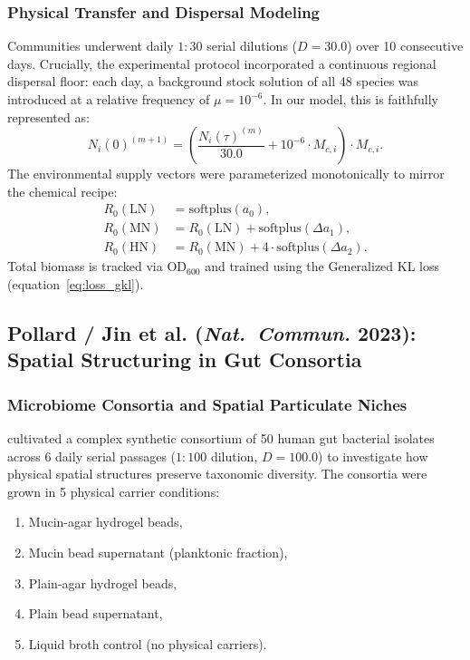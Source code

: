 \subsubsection{Physical Transfer and Dispersal Modeling}
Communities underwent daily $1:30$ serial dilutions ($D = 30.0$) over 10 consecutive days. Crucially, the experimental protocol incorporated a continuous regional dispersal floor: each day, a background stock solution of all 48 species was introduced at a relative frequency of $\mu = 10^{-6}$. In our model, this is faithfully represented as:
\begin{equation}
    N_i(0)^{(m+1)} = \left( \frac{N_i(\tau)^{(m)}}{30.0} + 10^{-6} \cdot M_{c, i} \right) \cdot M_{c, i}.
\end{equation}
The environmental supply vectors were parameterized monotonically to mirror the chemical recipe:
\begin{align}
    R_0(\text{LN}) &= \text{softplus}(a_0), \nonumber \\
    R_0(\text{MN}) &= R_0(\text{LN}) + \text{softplus}(\Delta a_1), \nonumber \\
    R_0(\text{HN}) &= R_0(\text{MN}) + 4 \cdot \text{softplus}(\Delta a_2).
\end{align}
Total biomass is tracked via $\text{OD}_{600}$ and trained using the Generalized KL loss (equation~\eqref{eq:loss_gkl}).

\subsection{Pollard / Jin et al. (\textit{Nat.\ Commun.} 2023): Spatial Structuring in Gut Consortia}
\subsubsection{Microbiome Consortia and Spatial Particulate Niches}
\citet{jin2023culturing} cultivated a complex synthetic consortium of 50 human gut bacterial isolates across 6 daily serial passages ($1:100$ dilution, $D = 100.0$) to investigate how physical spatial structures preserve taxonomic diversity. The consortia were grown in 5 physical carrier conditions:
\begin{enumerate}
    \item Mucin-agar hydrogel beads,
    \item Mucin bead supernatant (planktonic fraction),
    \item Plain-agar hydrogel beads,
    \item Plain bead supernatant,
    \item Liquid broth control (no physical carriers).
\end{enumerate}

